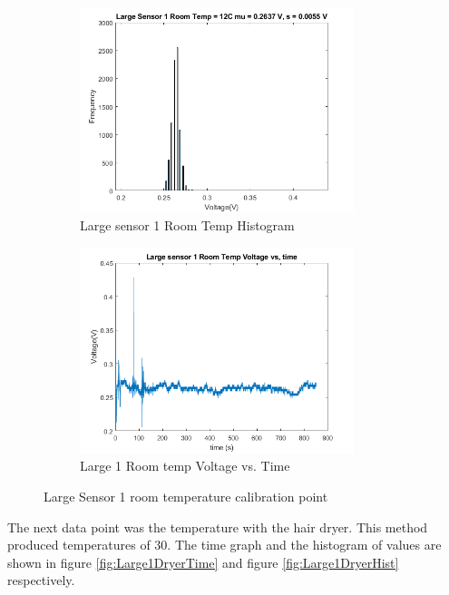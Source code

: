 \documentclass[12pt,a4paper]{report}
\begin{document}
\begin{figure}[h!]
\begin{subfigure}{0.5\textwidth}
    \includegraphics[width=1\linewidth, height=6cm]{Images/Large1RoomHist.png}
    \caption{Large sensor 1 Room Temp Histogram}
    \label{fig:Large1RoomHist}
\end{subfigure}
\begin{subfigure}{0.5\textwidth}
    \includegraphics[width=1\linewidth, height=6cm]{Images/Large1RoomTime.png}
    \caption{Large 1 Room temp Voltage vs. Time}
    \label{fig:Large1RoomTime}
\end{subfigure}
\caption{Large Sensor 1 room temperature calibration point}
\label{largeSensor1Room }
\end{figure}

The next data point was the temperature with the hair dryer. This method produced temperatures of 30\textcelsius{}. The time graph and the histogram of values are shown in figure \ref{fig:Large1DryerTime} and figure \ref{fig:Large1DryerHist} respectively.
\end{document}

